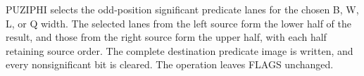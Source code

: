PUZIPHI selects the odd-position significant predicate lanes for the chosen B, W, L, or Q width.
The selected lanes from the left source form the lower half of the result, and those from the right source form the upper half, with each half retaining source order.
The complete destination predicate image is written, and every nonsignificant bit is cleared.
The operation leaves FLAGS unchanged.
